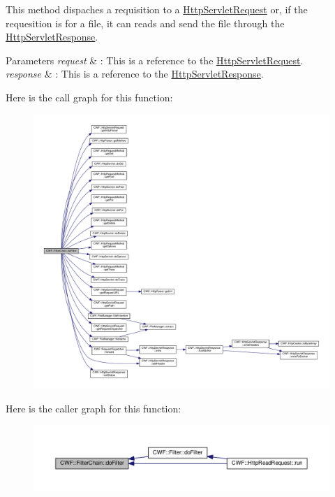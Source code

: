 This method dispaches a requisition to a \hyperlink{class_c_w_f_1_1_http_servlet_request}{Http\+Servlet\+Request} or, if the requesition is for a file, it can reads and send the file through the \hyperlink{class_c_w_f_1_1_http_servlet_response}{Http\+Servlet\+Response}. 


\begin{DoxyParams}{Parameters}
{\em request} & \+: This is a reference to the \hyperlink{class_c_w_f_1_1_http_servlet_request}{Http\+Servlet\+Request}. \\
\hline
{\em response} & \+: This is a reference to the \hyperlink{class_c_w_f_1_1_http_servlet_response}{Http\+Servlet\+Response}. \\
\hline
\end{DoxyParams}


Here is the call graph for this function\+:
\nopagebreak
\begin{figure}[H]
\begin{center}
\leavevmode
\includegraphics[width=350pt]{class_c_w_f_1_1_filter_chain_a438bc63ea1fa575ae8882fb05a31feca_cgraph}
\end{center}
\end{figure}




Here is the caller graph for this function\+:
\nopagebreak
\begin{figure}[H]
\begin{center}
\leavevmode
\includegraphics[width=350pt]{class_c_w_f_1_1_filter_chain_a438bc63ea1fa575ae8882fb05a31feca_icgraph}
\end{center}
\end{figure}




